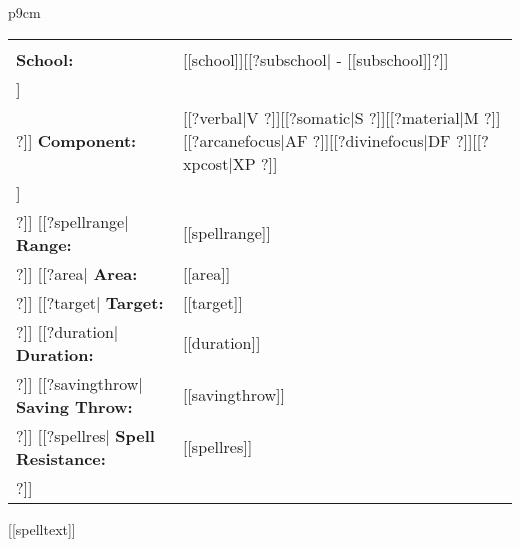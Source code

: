 \noindent



\begin{supertabular}{p{9cm}}
  \begin{center}
  \begin{tabular}{>{\raggedleft}p{4cm}>{\raggedright}p{4cm}}
    \multicolumn{1}{>{\raggedright}p{4cm}}{
      \scshape\footnotesize{[[book]]}
    } &
    \multicolumn{1}{>{\raggedleft}p{4cm}}{
      \scshape\footnotesize{[[d20class]] [[level]]}
    }\tabularnewline
    \rule{0pt}{4ex}
    \textbf{School:} & [[school]][[?subschool| - [[subschool]]?]] \tabularnewline
[[?descriptor|    \textbf{Descriptors:} & [[descriptor]] \tabularnewline?]]
    \textbf{Component:} &  [[?verbal|V ?]][[?somatic|S ?]][[?material|M ?]][[?arcanefocus|AF ?]][[?divinefocus|DF ?]][[?xpcost|XP ?]] \tabularnewline
[[?castingtime|    \textbf{Casting Time:} & [[castingtime]] \tabularnewline?]]
[[?spellrange|    \textbf{Range:} & {[[spellrange]]} \tabularnewline?]]
[[?area|    \textbf{Area:} & [[area]] \tabularnewline?]]
[[?target|    \textbf{Target:} & [[target]] \tabularnewline?]]
[[?duration|    \textbf{Duration:} & {[[duration]]} \tabularnewline?]]
[[?savingthrow|    \textbf{Saving Throw:} & [[savingthrow]] \tabularnewline?]]
[[?spellres|    \textbf{Spell Resistance:} & [[spellres]] \tabularnewline?]]
  \multicolumn{2}{c}{
    \pgfornament[width=3cm]{87}
   }\tabularnewline
  \end{tabular}
  \end{center}
[[spelltext]]\\
\rule{0pt}{4ex} \\
\end{supertabular} 
